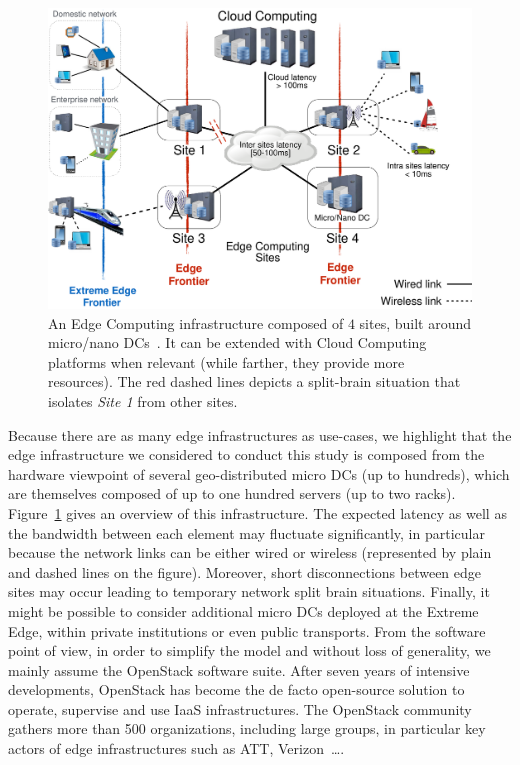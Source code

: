 \begin{figure}[t]
  \centering
  \includegraphics[width=\columnwidth]{./figures/figure_fog.pdf}
  \caption{An Edge Computing infrastructure composed of $4$ sites, built around
    micro/nano DCs~\cite{7923796}. It can be extended with Cloud Computing
    platforms when relevant (while farther, they provide more resources).
    The red dashed lines depicts a split-brain situation that isolates
    \emph{Site 1} from other sites.}
  \label{fig:fogedge-archi}
\end{figure}

Because there are as many edge infrastructures as use-cases, we
highlight that the edge infrastructure we considered to conduct this
study is composed from the hardware viewpoint of several
geo-distributed micro DCs (up to hundreds), which are themselves
composed of up to one hundred servers (up to two racks).
Figure~\ref{fig:fogedge-archi} gives an overview of this
infrastructure. The expected latency as well as the bandwidth between
each element may fluctuate significantly, in particular because the
network links can be either wired or wireless (represented by plain
and dashed lines on the figure). Moreover, short disconnections
between edge sites may occur leading to temporary network split brain
situations.  Finally, it might be possible
to consider additional micro DCs deployed at the Extreme Edge, within
private institutions or even public transports.
%
From the software point of view, in order to simplify the model and
without loss of generality, we mainly assume the OpenStack software
suite.  After seven years of intensive developments, OpenStack has
become the de facto open-source solution to operate, supervise and use
IaaS infrastructures.  The OpenStack community gathers more than 500
organizations, including large groups, in particular key actors of
edge infrastructures such as ATT, Verizon~\ldots.


